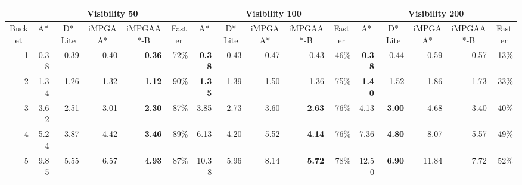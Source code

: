 \documentclass{article}
\newcommand{\fs}[1]{\fontsize{#1}{#1}\selectfont}
\begin{document}
\begin{table*}%
  \centering
  {\fs{7.5pt}
    \setlength{\tabcolsep}{2pt}
    \begin{tabular}{rrrrrrrrrrrrrrrr}
    \toprule

    \multicolumn{1}{c}{} & \multicolumn{5}{c}{Visibility 50}     & \multicolumn{5}{c}{Visibility 100}    & \multicolumn{5}{c}{Visibility 200} \\

    \midrule

    \multicolumn{1}{c}{Bucket} & \multicolumn{1}{c}{A*} & \multicolumn{1}{c}{D* Lite} & \multicolumn{1}{c}{iMPGAA*} & \multicolumn{1}{c}{iMPGAA*-B} & \multicolumn{1}{c}{Faster} & \multicolumn{1}{c}{A*} & \multicolumn{1}{c}{D* Lite} & \multicolumn{1}{c}{iMPGAA*} & \multicolumn{1}{c}{iMPGAA*-B} & \multicolumn{1}{c}{Faster} & \multicolumn{1}{c}{A*} & \multicolumn{1}{c}{D* Lite} & \multicolumn{1}{c}{iMPGAA*} & \multicolumn{1}{c}{iMPGAA*-B} & \multicolumn{1}{c}{Faster} \\

    1     &        0.38  &        0.39  &         0.40  & \textbf{            0.36} & 72\%  & \textbf{       0.38} &     0.43  &         0.47  &             0.43  & 46\%  & \textbf{       0.38} &     0.44  &         0.59  &             0.57  & 13\% \\

    2     &        1.34  &        1.26  &         1.32  & \textbf{            1.12} & 90\%  & \textbf{       1.35} &     1.39  &         1.50  &             1.36  & 75\%  & \textbf{       1.40} &     1.52  &         1.86  &             1.73  & 33\% \\

    3     &        3.62  &        2.51  &         3.01  & \textbf{            2.30} & 87\%  &        3.85  &     2.73  &         3.60  & \textbf{            2.63 } & 76\%  &        4.13  & \textbf{    3.00} &         4.68  &             3.40  & 40\% \\

    4     &        5.24  &        3.87  &         4.42  & \textbf{            3.46} & 89\%  &        6.13  &     4.20  &         5.52  & \textbf{            4.14} & 76\%  &        7.36  & \textbf{    4.80} &         8.07  &             5.57  & 49\% \\

    5     &        9.85  &        5.55  &         6.57  & \textbf{            4.93} & 87\%  &     10.38  &     5.96  &         8.14  & \textbf{            5.72} & 78\%  &     12.50  & \textbf{    6.90} &       11.84  &             7.72  & 52\% \\


\end{tabular}}
\end{table*}
\end{document}
